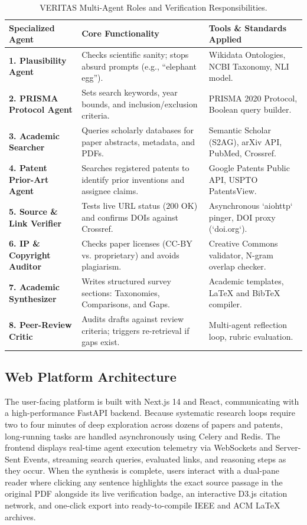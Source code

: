 \documentclass[11pt,a4paper]{article}
\begin{document}
\begin{table}[htbp]
\centering
\small
\begin{tabularx}{\textwidth}{l p{4.6cm} X}
\toprule
\textbf{Specialized Agent} & \textbf{Core Functionality} & \textbf{Tools \& Standards Applied} \\
\midrule
\textbf{1. Plausibility Agent} & Checks scientific sanity; stops absurd prompts (e.g., ``elephant egg''). & Wikidata Ontologies, NCBI Taxonomy, NLI model. \\
\textbf{2. PRISMA Protocol Agent} & Sets search keywords, year bounds, and inclusion/exclusion criteria. & PRISMA 2020 Protocol, Boolean query builder. \\
\textbf{3. Academic Searcher} & Queries scholarly databases for paper abstracts, metadata, and PDFs. & Semantic Scholar (S2AG), arXiv API, PubMed, Crossref. \\
\textbf{4. Patent Prior-Art Agent} & Searches registered patents to identify prior inventions and assignee claims. & Google Patents Public API, USPTO PatentsView. \\
\textbf{5. Source \& Link Verifier} & Tests live URL status ($200\text{ OK}$) and confirms DOIs against Crossref. & Asynchronous `aiohttp` pinger, DOI proxy (`doi.org`). \\
\textbf{6. IP \& Copyright Auditor} & Checks paper licenses (CC-BY vs. proprietary) and avoids plagiarism. & Creative Commons validator, N-gram overlap checker. \\
\textbf{7. Academic Synthesizer} & Writes structured survey sections: Taxonomies, Comparisons, and Gaps. & Academic templates, LaTeX and BibTeX compiler. \\
\textbf{8. Peer-Review Critic} & Audits drafts against review criteria; triggers re-retrieval if gaps exist. & Multi-agent reflection loop, rubric evaluation. \\
\bottomrule
\end{tabularx}
\caption{VERITAS Multi-Agent Roles and Verification Responsibilities.}
\label{tab:agent_roles}
\end{table}

\subsection{Web Platform Architecture}
The user-facing platform is built with Next.js 14 and React, communicating with a high-performance FastAPI backend. Because systematic research loops require two to four minutes of deep exploration across dozens of papers and patents, long-running tasks are handled asynchronously using Celery and Redis. The frontend displays real-time agent execution telemetry via WebSockets and Server-Sent Events, streaming search queries, evaluated links, and reasoning steps as they occur. When the synthesis is complete, users interact with a dual-pane reader where clicking any sentence highlights the exact source passage in the original PDF alongside its live verification badge, an interactive D3.js citation network, and one-click export into ready-to-compile IEEE and ACM LaTeX archives.
\end{document}
